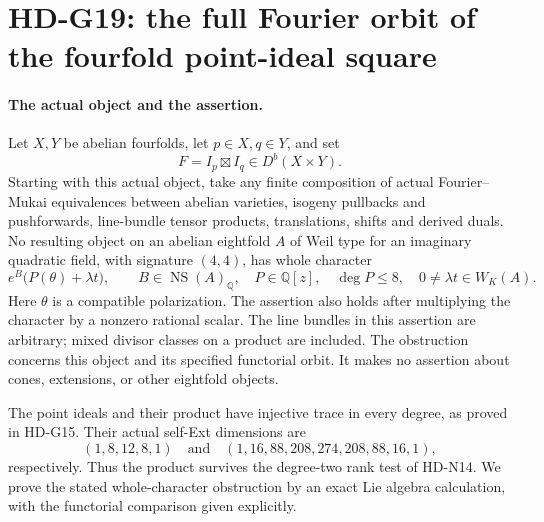 \section{HD-G19: the full Fourier orbit of the fourfold point-ideal square}
\label{sec:point-square-full-spin}

\paragraph{The actual object and the assertion.}
Let \(X,Y\) be abelian fourfolds, let \(p\in X,q\in Y\), and set
\[
                  F=I_p\boxtimes I_q\in D^b(X\times Y).
\]
Starting with this actual object, take any finite composition of actual
Fourier--Mukai equivalences between abelian varieties, isogeny pullbacks
and pushforwards, line-bundle tensor products, translations, shifts and
derived duals.
No resulting object on an abelian eightfold \(A\) of Weil type for an
imaginary quadratic field, with signature \((4,4)\), has whole character
\begin{equation}\label{eq:G19-whole-character}
 e^B\bigl(P(\theta)+\lambda t\bigr),
 \qquad B\in\operatorname{NS}(A)_{\mathbb Q},\quad
 P\in\mathbb Q[z],\quad\deg P\le8,
 \quad0\ne\lambda t\in W_K(A).
\end{equation}
Here \(\theta\) is a compatible polarization. The assertion also holds
after multiplying the character by a nonzero rational scalar.
The line bundles in this assertion are arbitrary; mixed divisor classes
on a product are included. The obstruction concerns this object and its
specified functorial orbit. It makes no assertion about cones, extensions,
or other eightfold objects.

The point ideals and their product have injective trace in every degree,
as proved in HD-G15. Their actual self-Ext dimensions are
\[
 (1,8,12,8,1)\quad\text{and}\quad
 (1,16,88,208,274,208,88,16,1),
\]
respectively. Thus the product survives the degree-two rank test of
HD-N14. We prove the stated whole-character obstruction by an exact
Lie algebra calculation, with the functorial comparison given explicitly.

